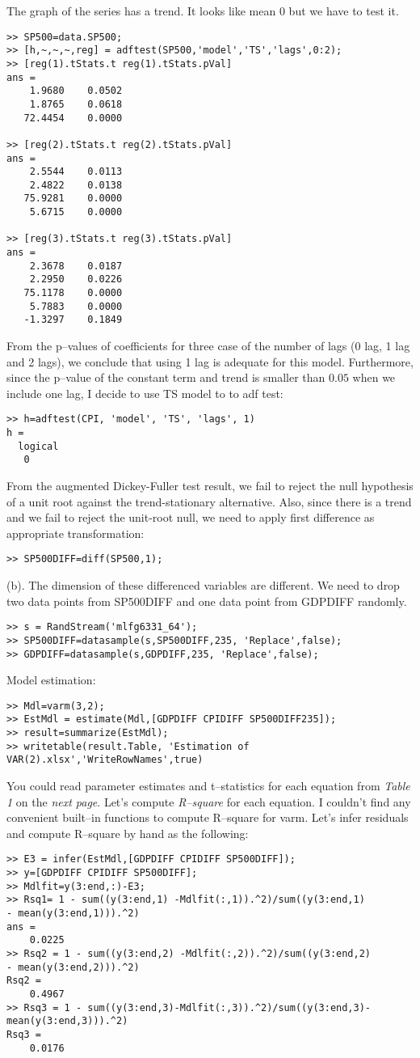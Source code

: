 \documentclass[11pt]{article}
\begin{document}
The graph of the series has a trend. It looks like mean $0$ but we have to test it. 
\begin{lstlisting}
>> SP500=data.SP500;
>> [h,~,~,~,reg] = adftest(SP500,'model','TS','lags',0:2);
>> [reg(1).tStats.t reg(1).tStats.pVal]
ans =
    1.9680    0.0502
    1.8765    0.0618
   72.4454    0.0000

>> [reg(2).tStats.t reg(2).tStats.pVal]
ans =
    2.5544    0.0113
    2.4822    0.0138
   75.9281    0.0000
    5.6715    0.0000

>> [reg(3).tStats.t reg(3).tStats.pVal]
ans =
    2.3678    0.0187
    2.2950    0.0226
   75.1178    0.0000
    5.7883    0.0000
   -1.3297    0.1849
\end{lstlisting}
From the p--values of coefficients for three case of the number of lags (0 lag, 1 lag and 2 lags), we conclude that using 1 lag is adequate for this model. Furthermore, since the p--value of the constant term and trend is smaller than $0.05$ when we include one lag, I decide to use TS model to to adf test:
\begin{lstlisting}
>> h=adftest(CPI, 'model', 'TS', 'lags', 1)
h =
  logical
   0
\end{lstlisting}
From the augmented Dickey-Fuller test result, we fail to reject the null hypothesis of a unit root against the trend-stationary alternative. Also, since there is a trend and we fail to reject the unit-root null, we need to apply first difference as appropriate transformation:
\begin{lstlisting}
>> SP500DIFF=diff(SP500,1);
\end{lstlisting}

\bigskip
(b). The dimension of these differenced variables are different. We need to drop two data points from SP500DIFF and one data point from GDPDIFF randomly.
\begin{lstlisting}
>> s = RandStream('mlfg6331_64'); 
>> SP500DIFF=datasample(s,SP500DIFF,235, 'Replace',false);
>> GDPDIFF=datasample(s,GDPDIFF,235, 'Replace',false);
\end{lstlisting}
Model estimation:
\begin{lstlisting}
>> Mdl=varm(3,2);
>> EstMdl = estimate(Mdl,[GDPDIFF CPIDIFF SP500DIFF235]);
>> result=summarize(EstMdl);
>> writetable(result.Table, 'Estimation of VAR(2).xlsx','WriteRowNames',true)
\end{lstlisting}

You could read parameter estimates and t--statistics for each equation from \textit{Table 1} on the \textit{next page}. Let's compute\textit{ R--square} for each equation. I couldn't find any convenient built--in functions to compute R--square for varm. Let's infer residuals and compute R--square by hand as the following:
\begin{lstlisting}
>> E3 = infer(EstMdl,[GDPDIFF CPIDIFF SP500DIFF]);
>> y=[GDPDIFF CPIDIFF SP500DIFF];
>> Mdlfit=y(3:end,:)-E3;
>> Rsq1= 1 - sum((y(3:end,1) -Mdlfit(:,1)).^2)/sum((y(3:end,1)
- mean(y(3:end,1))).^2)
ans =
    0.0225
>> Rsq2 = 1 - sum((y(3:end,2) -Mdlfit(:,2)).^2)/sum((y(3:end,2)
- mean(y(3:end,2))).^2)
Rsq2 =
    0.4967
>> Rsq3 = 1 - sum((y(3:end,3)-Mdlfit(:,3)).^2)/sum((y(3:end,3)- mean(y(3:end,3))).^2)
Rsq3 =
    0.0176
\end{lstlisting}
\end{document}
